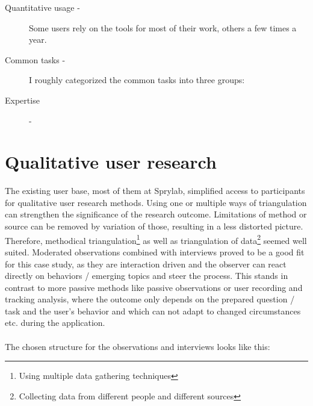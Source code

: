 \begin{description}
  \item[Quantitative usage -] Some users rely on the tools for most of their work, others a few times a year.
  \item[Common tasks -] I roughly categorized the common tasks into three groups:
  \item[Expertise] -
\end{description}

\section{Qualitative user research}

The existing user base, most of them at Sprylab, simplified access to participants for qualitative user research methods.
Using one or multiple ways of triangulation \cite[p. 264]{Interactiondesign:2019ys} can strengthen the significance of the research outcome. Limitations of method or source can be removed by variation of those, resulting in a less distorted picture.
Therefore, methodical triangulation\footnote{Using multiple data gathering techniques} as well as triangulation of data\footnote{Collecting data from different people and different sources} seemed well suited.
Moderated observations combined with interviews proved to be a good fit for this case study, as they are interaction driven and the observer can react directly on behaviors / emerging topics and steer the process.
This stands in contrast to more passive methods like passive observations or user recording and tracking analysis, where the outcome only depends on the
prepared question / task and the user's behavior and which can not adapt to changed circumstances etc. during the application.
\\\\
The chosen structure for the observations and interviews looks like this:

